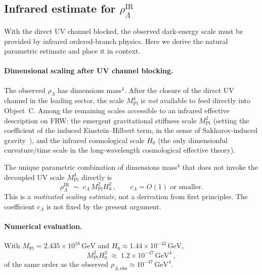 \subsection{Infrared estimate for $\rho_{\Lambda}^{\mathrm{IR}}$}
\label{subsec:IR_estimate_cc}

With the direct UV channel blocked, the observed dark-energy scale
must be provided by infrared ordered-branch physics. Here we derive
the natural parametric estimate and place it in context.

\paragraph{Dimensional scaling after UV channel blocking.} The
observed $\rho_\Lambda$ has dimensions mass$^4$. After the closure of
the direct UV channel in the leading sector, the scale
$M_{\mathrm{Pl}}^4$ is \emph{not} available to feed directly into
Object~C. Among the remaining scales accessible to an infrared
effective description on FRW: the emergent
gravitational stiffness scale $M_{\mathrm{Pl}}^2$ (setting the
coefficient of the induced Einstein--Hilbert term, in the sense of
Sakharov-induced gravity~\cite{Sakharov1967,Adler1982}), and the
infrared cosmological scale $H_0$ (the only dimensionful
curvature/time scale in the long-wavelength cosmological effective
theory).

The unique parametric combination of dimensions mass$^4$ that does not
invoke the decoupled UV scale $M_{\mathrm{Pl}}^4$ directly is
\begin{equation}
\boxed{\;\rho_\Lambda^{\mathrm{IR}} \;\sim\; c_\Lambda\,
M_{\mathrm{Pl}}^2 H_0^2\,,
\qquad c_\Lambda = O(1)\text{ or smaller.}\;}
\label{eq:IR_estimate_cc}
\end{equation}
This is a \emph{motivated scaling estimate}, not a derivation from
first principles. The coefficient $c_\Lambda$ is not fixed by the
present argument.

\paragraph{Numerical evaluation.} With $M_{\mathrm{Pl}} =
2.435\times 10^{18}\,\mathrm{GeV}$ and
$H_0 \approx 1.44\times 10^{-42}\,\mathrm{GeV}$,
\begin{equation}
M_{\mathrm{Pl}}^2 H_0^2 \;\approx\; 1.2\times 10^{-47}\,\mathrm{GeV}^4\,,
\end{equation}
of the same order as the observed
$\rho_{\Lambda,\mathrm{obs}} \approx 10^{-47}\,\mathrm{GeV}^4$.

